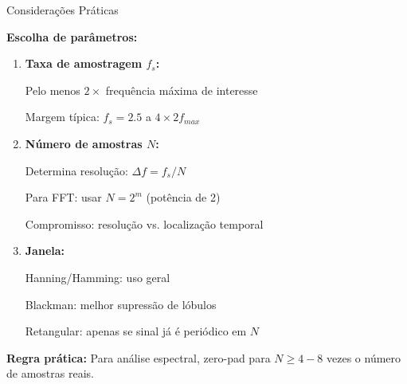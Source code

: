 \begin{frame}{Considerações Práticas}

\textbf{Escolha de parâmetros:}

\begin{enumerate}
\item \textbf{Taxa de amostragem $f_s$:}
   
   Pelo menos $2 \times$ frequência máxima de interesse
   
   Margem típica: $f_s = 2.5$ a $4 \times 2f_{max}$

\item \textbf{Número de amostras $N$:}
   
   Determina resolução: $\Delta f = f_s/N$
   
   Para FFT: usar $N = 2^m$ (potência de 2)
   
   Compromisso: resolução vs. localização temporal

\item \textbf{Janela:}
   
   Hanning/Hamming: uso geral
   
   Blackman: melhor supressão de lóbulos
   
   Retangular: apenas se sinal já é periódico em $N$
\end{enumerate}

\vspace{0.1cm}

\textbf{Regra prática:} Para análise espectral, zero-pad para $N \geq 4-8$ vezes o número de amostras reais.

\end{frame}


